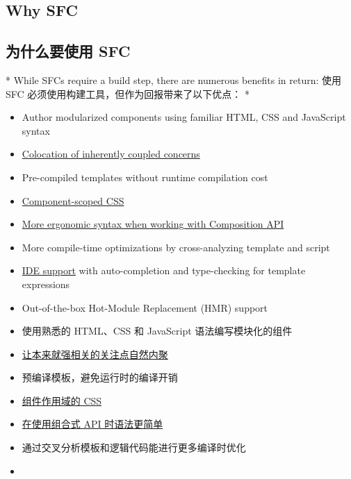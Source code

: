 \begin{paracol}{2}
\subsection{Why SFC}
\switchcolumn
\subsection{为什么要使用 SFC}
\switchcolumn[0]*%
While SFCs require a build step, there are numerous benefits in return:
\switchcolumn
使用 SFC 必须使用构建工具，但作为回报带来了以下优点：
\switchcolumn[0]*%
\begin{itemize}
\item
  Author modularized components using familiar HTML, CSS and JavaScript
  syntax
\item
  \href{https://vuejs.org/guide/scaling-up/sfc.html\#what-about-separation-of-concerns}{Colocation
  of inherently coupled concerns}
\item
  Pre-compiled templates without runtime compilation cost
\item
  \href{https://vuejs.org/api/sfc-css-features.html}{Component-scoped
  CSS}
\item
  \href{https://vuejs.org/api/sfc-script-setup.html}{More ergonomic
  syntax when working with Composition API}
\item
  More compile-time optimizations by cross-analyzing template and script
\item
  \href{https://vuejs.org/guide/scaling-up/tooling.html\#ide-support}{IDE
  support} with auto-completion and type-checking for template
  expressions
\item
  Out-of-the-box Hot-Module Replacement (HMR) support
\end{itemize}
\switchcolumn
\begin{itemize}
\item
  使用熟悉的 HTML、CSS 和 JavaScript 语法编写模块化的组件
\item
  \href{https://cn.vuejs.org/guide/scaling-up/sfc.html\#what-about-separation-of-concerns}{让本来就强相关的关注点自然内聚}
\item
  预编译模板，避免运行时的编译开销
\item
  \href{https://cn.vuejs.org/api/sfc-css-features.html}{组件作用域的
  CSS}
\item
  \href{https://cn.vuejs.org/api/sfc-script-setup.html}{在使用组合式 API
  时语法更简单}
\item
  通过交叉分析模板和逻辑代码能进行更多编译时优化
\item

\end{itemize}
\end{paracol}
